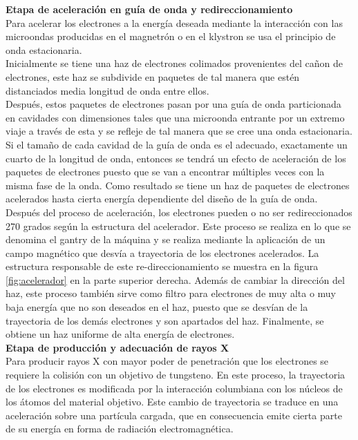 \textbf{Etapa de aceleración en guía de onda y redireccionamiento}\\

Para acelerar los electrones a la energía deseada mediante la interacción con las microondas producidas en el magnetrón o en el klystron se usa el principio de onda estacionaria. \\

Inicialmente se tiene una haz de electrones colimados provenientes del cañon de electrones, este haz se subdivide en paquetes de tal manera que estén distanciados media longitud de onda entre ellos. \\
 
Después, estos paquetes de electrones pasan por una guía de onda particionada en cavidades con dimensiones tales que una microonda entrante por un extremo viaje a través de esta y se refleje de tal manera que se cree una onda estacionaria.  Si el tamaño de cada cavidad de la guía de onda es el adecuado, exactamente un cuarto de la longitud de onda, entonces se tendrá  un efecto de aceleración de los paquetes de electrones puesto que se van a encontrar múltiples veces con la misma fase de la onda. Como resultado se tiene un haz de paquetes de electrones acelerados hasta cierta energía dependiente del diseño de la guía de onda.\\

Después del proceso de aceleración, los electrones pueden o no ser redireccionados 270 grados según la estructura del acelerador. Este proceso se realiza en lo que se denomina el gantry de la máquina y se realiza mediante la aplicación de un campo magnético que desvía a trayectoria de los electrones acelerados. La estructura responsable de este re-direccionamiento se muestra en la figura \ref{fig:acelerador} en la parte superior derecha. Además de cambiar la dirección del haz, este proceso también sirve como filtro para electrones de muy alta o muy baja  energía que no son deseados en el haz, puesto que se desvían de la trayectoria de los demás electrones y son apartados del haz. Finalmente, se obtiene un haz uniforme de alta energía de electrones. \\ 

\textbf{Etapa de producción y adecuación de rayos X}\\

Para producir rayos X con mayor poder de penetración que los electrones se requiere la colisión con un objetivo de tungsteno. En este proceso, la trayectoria de los electrones es modificada por la interacción columbiana con los núcleos de los átomos del material objetivo. Este cambio de trayectoria se traduce en una aceleración sobre una partícula cargada, que en consecuencia emite cierta parte de su energía en forma de radiación electromagnética. \\

